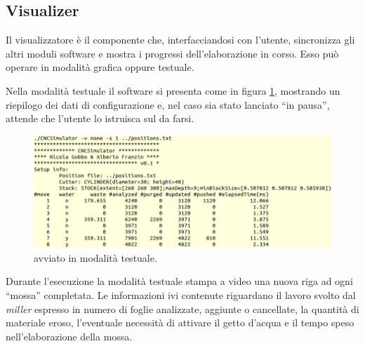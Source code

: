 \subsection{Visualizer}
Il visualizzatore è il componente che, interfacciandosi con l'utente, sincronizza gli altri moduli software e mostra i progressi dell'elaborazione in corso. Esso può operare in modalità grafica oppure testuale.

Nella modalità testuale il software si presenta come in figura \ref{fig:visualizer_textmode}, mostrando un riepilogo dei dati di configurazione e, nel caso sia stato lanciato ``in pausa'', attende che l'utente lo istruisca sul da farsi.
\begin{figure}[htp]
	\centering
	\includegraphics[width=.85\textwidth]{img/visualizer_textmode}
	\caption{ avviato in modalità testuale.}
	\label{fig:visualizer_textmode}
\end{figure}

Durante l'esecuzione la modalità testuale stampa a video una nuova riga ad ogni ``mossa'' completata. Le informazioni ivi contenute riguardano il lavoro svolto dal \emph{miller} espresso in numero di foglie analizzate, aggiunte o cancellate, la quantità di materiale eroso, l'eventuale necessità di attivare il getto d'acqua e il tempo speso nell'elaborazione della mossa.

